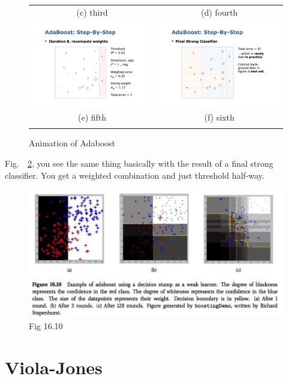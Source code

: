 \documentclass[a4paper]{article}
\begin{document}
\begin{figure}
\begin{tabular}{cc}
(c) third & (d) fourth \\[6pt]
 \includegraphics[width=65mm]{adaboost5.png} &
  \includegraphics[width=65mm]{adaboost6.png} \\
(e) fifth & (f) sixth \\[6pt]
\multicolumn{2}{c}{}
\end{tabular}
\caption{\label{fig:anim}Animation of Adaboost}
\end{figure}

Fig.\ ~\ref{fig:boost4}, you see the same thing basically with the result of a final strong classifier.  You get a weighted combination and just threshold half-way.

\begin{figure}
\centering
\includegraphics[width=1.0\textwidth]{fig16_10.png}
\caption{\label{fig:boost4}Fig 16.10}
\end{figure}

\section{Viola-Jones}
\end{document}
